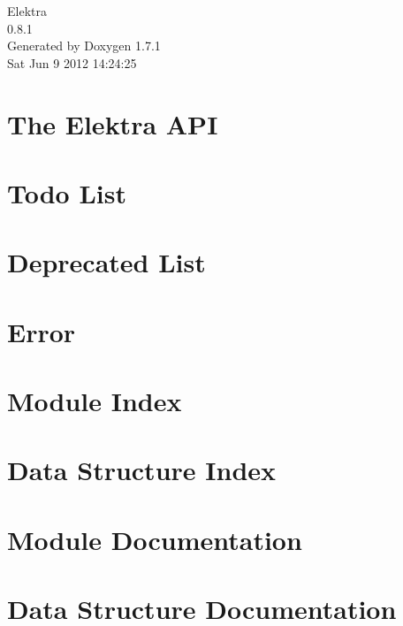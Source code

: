 \documentclass[a4paper]{book}
\begin{document}
\hypersetup{pageanchor=false}
\begin{titlepage}
\vspace*{7cm}
\begin{center}
{\Large Elektra \\[1ex]\large 0.8.1 }\\
\vspace*{1cm}
{\large Generated by Doxygen 1.7.1}\\
\vspace*{0.5cm}
{\small Sat Jun 9 2012 14:24:25}\\
\end{center}
\end{titlepage}
\clearemptydoublepage
{}
\tableofcontents
\clearemptydoublepage
{}
\hypersetup{pageanchor=true}
\chapter{The Elektra API}
\label{index}\hypertarget{index}{}
\chapter{Todo List}
\label{todo}
\hypertarget{todo}{}

\chapter{Deprecated List}
\label{deprecated}
\hypertarget{deprecated}{}

\chapter{Error}
\label{err}
\hypertarget{err}{}

\chapter{Module Index}

\chapter{Data Structure Index}

\chapter{Module Documentation}













\chapter{Data Structure Documentation}







\printindex
\end{document}
